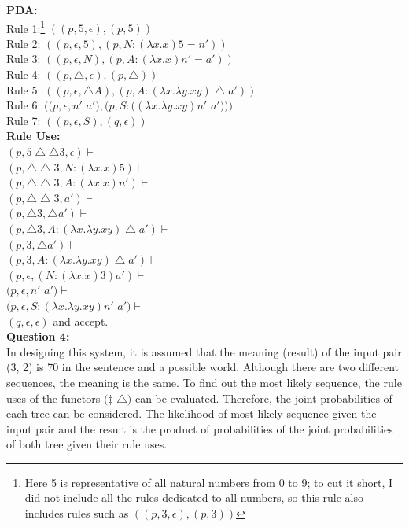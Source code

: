 \documentclass[12pt,a4paper]{article}
\begin{document}
\noindent \textbf{PDA:}\\
Rule 1:\footnote{Here 5 is representative of all natural numbers from 0 to 9; to cut it short, I did not include all the rules dedicated to all numbers, so this rule also includes rules such as $((p,3,\epsilon),(p,3))$}  $((p,5,\epsilon ),(p,5))$\\
Rule 2: $((p,\epsilon,5 ),(p,N: (\lambda x.x)5=n'))$\\
Rule 3: $((p,\epsilon,N ),(p,A: (\lambda x.x)n'=a'))$\\
Rule 4: $((p,\bigtriangleup,\epsilon ),(p,\bigtriangleup))$\\
Rule 5: $((p,\epsilon,\bigtriangleup A ),(p,A: (\lambda x.\lambda y.xy)\bigtriangleup a'))$\\
Rule 6: $((p,\epsilon,n'$ $a' ),(p,S: ((\lambda x.\lambda y.xy)n'$ $a')))$\\
Rule 7: $((p,\epsilon,S ),(q,\epsilon))$\\

\noindent \textbf{Rule Use:}\\
$(p,5 \bigtriangleup \bigtriangleup 3,\epsilon)\vdash$\\
$(p,\bigtriangleup \bigtriangleup 3,N: (\lambda x.x)5) \vdash$\\
$(p,\bigtriangleup \bigtriangleup 3,A: (\lambda x.x)n') \vdash$\\
$(p,\bigtriangleup \bigtriangleup 3,a') \vdash$\\
$(p,\bigtriangleup 3,\bigtriangleup a') \vdash$\\
$(p,\bigtriangleup 3,A: (\lambda x.\lambda y.xy)\bigtriangleup a') \vdash$\\
$(p,3,\bigtriangleup a') \vdash$\\
$(p,3,A: (\lambda x.\lambda y.xy)\bigtriangleup a') \vdash$\\
$(p,\epsilon,(N: (\lambda x.x)3) a') \vdash$\\
$(p,\epsilon,n'$ $a') \vdash$\\
$(p,\epsilon,S: (\lambda x.\lambda y.xy)n'$ $a')\vdash$\\
$(q,\epsilon,\epsilon)$ and accept.\\
\clearpage
\noindent \textbf{Question 4:}\\

\noindent In designing this system, it is assumed that the meaning (result) of the input pair (3, 2) is 70 in the sentence and a possible world. Although there are two different sequences, the meaning is the same. To find out the most likely sequence, the rule uses of the functors $(\ddagger$ $\bigtriangleup)$ can be evaluated. Therefore, the joint probabilities of each tree can be considered. The likelihood of most likely sequence given the input pair and the result is the product of probabilities of the joint probabilities of both tree given their rule uses.\\
\end{document}
